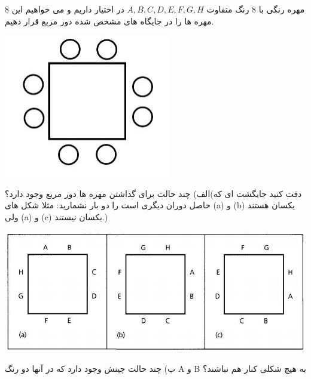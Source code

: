 \exercise
$8$
 مهره رنگی با 
$8$
  رنگ متفاوت 
$A, B, C, D, E, F, G, H$
در اختیار داریم و می خواهیم این مهره ها را در جایگاه های مشخص شده دور مربع قرار دهیم.
    \begin{center}
     	\includegraphics[scale=0.2]{./1.png}
    \end{center}
الف) چند حالت برای گذاشتن مهره ها دور مربع وجود دارد؟(دقت کنید جایگشت ای که حاصل دوران دیگری است را دو بار نشمارید: مثلا شکل های (a) و (b) یکسان هستند ولی (a) و (c) یکسان نیستند.)
\begin{center}
	\includegraphics[scale=0.3]{./2.png}
\end{center}
ب) چند حالت چینش وجود دارد که در آنها دو رنگ A و B به هیچ شکلی کنار هم نباشند؟